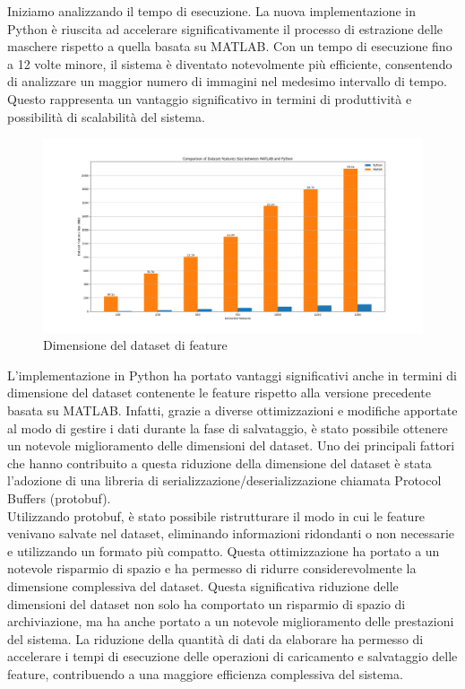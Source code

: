 \documentclass[a4paper,12pt]{report}
\begin{document}
    Iniziamo analizzando il tempo di esecuzione. La nuova implementazione in Python è riuscita ad accelerare significativamente il processo di estrazione delle maschere rispetto a quella basata su MATLAB. Con un tempo di esecuzione fino a 12 volte minore, il sistema è diventato notevolmente più efficiente, consentendo di analizzare un maggior numero di immagini nel medesimo intervallo di tempo. Questo rappresenta un vantaggio significativo in termini di produttività e possibilità di scalabilità del sistema.
    
    \begin{figure}[H]
      \centering
      \includegraphics[width=\textwidth]{assets/images/results/result_dataset_size.png}   
      \caption{Dimensione del dataset di feature}
    \end{figure}

    L'implementazione in Python ha portato vantaggi significativi anche in termini di dimensione del dataset contenente le feature rispetto alla versione precedente basata su MATLAB. Infatti, grazie a diverse ottimizzazioni e modifiche apportate al modo di gestire i dati durante la fase di salvataggio, è stato possibile ottenere un notevole miglioramento delle dimensioni del dataset.
    Uno dei principali fattori che hanno contribuito a questa riduzione della dimensione del dataset è stata l'adozione di una libreria di serializzazione/deserializzazione chiamata Protocol Buffers (protobuf).
    \\
    Utilizzando protobuf, è stato possibile ristrutturare il modo in cui le feature venivano salvate nel dataset, eliminando informazioni ridondanti o non necessarie e utilizzando un formato più compatto. Questa ottimizzazione ha portato a un notevole risparmio di spazio e ha permesso di ridurre considerevolmente la dimensione complessiva del dataset.
    Questa significativa riduzione delle dimensioni del dataset non solo ha comportato un risparmio di spazio di archiviazione, ma ha anche portato a un notevole miglioramento delle prestazioni del sistema. La riduzione della quantità di dati da elaborare ha permesso di accelerare i tempi di esecuzione delle operazioni di caricamento e salvataggio delle feature, contribuendo a una maggiore efficienza complessiva del sistema.
\end{document}
